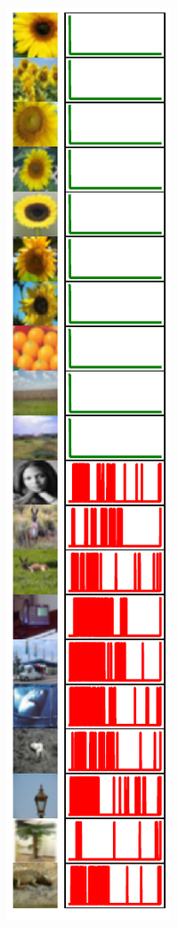 \begin{figure}[t]
\begin{subfigure}[b]{0.23\linewidth}
\end{subfigure}
\hfill
\begin{subfigure}[b]{0.23\linewidth}
  \centering
  \includegraphics[width=\linewidth]{figs/sptd/cifar100_points_ext.pdf}

\end{subfigure}
\end{figure}
